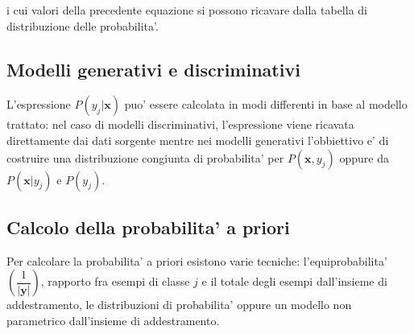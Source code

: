 i cui valori della precedente equazione si possono ricavare dalla tabella di distribuzione delle probabilita'.

\subsection{Modelli generativi e discriminativi}
L'espressione $P(y_j|\textbf{x})$ puo' essere calcolata in modi differenti in base al modello trattato: nel caso di modelli discriminativi, l'espressione viene ricavata direttamente dai dati sorgente mentre nei modelli generativi l'obbiettivo e' di costruire una distribuzione congiunta di probabilita' per $P(\textbf{x}, y_j)$ oppure da $P(\textbf{x}| y_j)$ e $P(y_j)$.

\subsection{Calcolo della probabilita' a priori}
  Per calcolare la probabilita' a priori esistono varie tecniche: l'equiprobabilita' $\left(\dfrac{1}{|\textbf{y}|}\right)$, rapporto fra esempi di classe $j$ e il totale degli esempi dall'insieme di addestramento, le distribuzioni di probabilita' oppure un modello non parametrico dall'insieme di addestramento.
  
